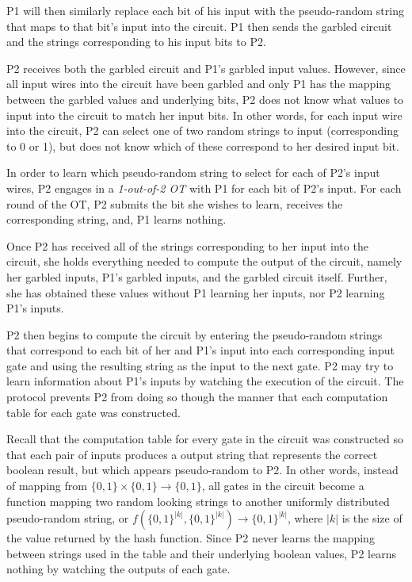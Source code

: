 \ac{P1} will then similarly replace each bit of his input with the pseudo-random string that maps to that bit's input into the circuit. \ac{P1} then sends the garbled circuit and the strings corresponding to his input bits to \ac{P2}.

\ac{P2} receives both the garbled circuit and \ac{P1}'s garbled input values. However, since all input wires into the circuit have been garbled and only \ac{P1} has the mapping between the garbled values and underlying bits, \ac{P2} does not know what values to input into the circuit to match her input bits.
In other words, for each input wire into the circuit, \ac{P2} can select one of two random strings to input (corresponding to 0 or 1), but does not know which of these correspond to her desired input bit.

In order to learn which pseudo-random string to select for each of \ac{P2}'s input wires, \ac{P2} engages in a \emph{1-out-of-2 \ac{OT}} with \ac{P1} for each bit of \ac{P2}'s input. For each round of the \ac{OT}, \ac{P2} submits the bit she wishes to learn, receives the corresponding string, and, \ac{P1} learns nothing.

Once \ac{P2} has received all of the strings corresponding to her input into the circuit, she holds everything needed to compute the output of the circuit, namely her garbled inputs, \ac{P1}'s garbled inputs, and the garbled circuit itself. Further, she has obtained these values without \ac{P1} learning her inputs, nor \ac{P2} learning \ac{P1}'s inputs.

\ac{P2} then begins to compute the circuit by entering the pseudo-random strings that correspond to each bit of her and \ac{P1}'s input into each corresponding input gate and using the resulting string as the input to the next gate. \ac{P2} may try to learn information about \ac{P1}'s inputs by watching the execution of the circuit. The protocol prevents \ac{P2} from doing so though the manner that each computation table for each gate was constructed.

Recall that the computation table for every gate in the circuit was constructed so that each pair of inputs produces a output string that represents the correct boolean result, but which appears pseudo-random to \ac{P2}.  In other words, instead of mapping from $\{0, 1\} \times \{0, 1\} \to \{0, 1\}$, all gates in the circuit become a function mapping two random looking strings to another uniformly distributed pseudo-random string, or $f(\{0, 1\}^{|k|}, \{0, 1\}^{|k|}) \to \{0, 1\}^{|k|}$, where $|k|$ is the size of the value returned by the hash function. Since \ac{P2} never learns the mapping between strings used in the table and their underlying boolean values, \ac{P2} learns nothing by watching the outputs of each gate.

